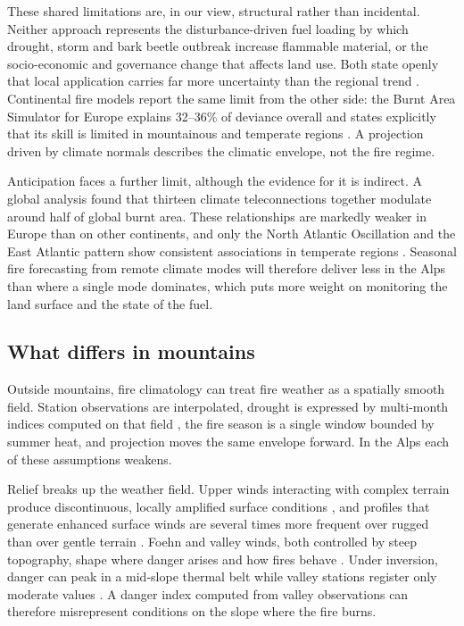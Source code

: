 \documentclass[11pt,a4paper]{article}
\begin{document}
These shared limitations are, in our view, structural rather than incidental. Neither approach represents the disturbance-driven fuel loading by which drought, storm and bark beetle outbreak increase flammable material, or the socio-economic and governance change that affects land use. Both state openly that local application carries far more uncertainty than the regional trend \citep{gerberding_mapping_2025}. Continental fire models report the same limit from the other side: the Burnt Area Simulator for Europe explains 32--36\% of deviance overall and states explicitly that its skill is limited in mountainous and temperate regions \citep{forrest_understanding_2024}. A projection driven by climate normals describes the climatic envelope, not the fire regime.

Anticipation faces a further limit, although the evidence for it is indirect. A global analysis found that thirteen climate teleconnections together modulate around half of global burnt area. These relationships are markedly weaker in Europe than on other continents, and only the North Atlantic Oscillation and the East Atlantic pattern show consistent associations in temperate regions \citep{cardil_climate_2023}. Seasonal fire forecasting from remote climate modes will therefore deliver less in the Alps than where a single mode dominates, which puts more weight on monitoring the land surface and the state of the fuel.

\subsection{What differs in mountains}

Outside mountains, fire climatology can treat fire weather as a spatially smooth field. Station observations are interpolated, drought is expressed by multi-month indices computed on that field \citep{miller_compounding_2025}, the fire season is a single window bounded by summer heat, and projection moves the same envelope forward. In the Alps each of these assumptions weakens.

Relief breaks up the weather field. Upper winds interacting with complex terrain produce discontinuous, locally amplified surface conditions \citep{sharples_overview_2009}, and profiles that generate enhanced surface winds are several times more frequent over rugged than over gentle terrain \citep{ozaki_impact_2022}. Foehn and valley winds, both controlled by steep topography, shape where danger arises and how fires behave \citep{wastl_largescale_2013, melzner_wildfire-induced_2025}. Under inversion, danger can peak in a mid-slope thermal belt while valley stations register only moderate values \citep{schunk_forest_2013}. A danger index computed from valley observations can therefore misrepresent conditions on the slope where the fire burns.
\end{document}

